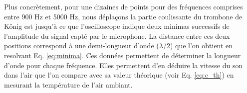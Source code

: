 Plus concrètement, pour une dizaines de points pour des fréquences comprises entre 900 Hz et 5000 Hz, nous déplaçons la partie coulissante du trombone de König est jusqu’à ce que l’oscilloscope indique deux minimas successifs de l’amplitude du signal capté par le microphone. La distance entre ces deux positions correspond à une demi-longueur d’onde ($\lambda$/2) que l'on obtient en resolvant Eq. \ref{eq:minima}. Ces données permettent de déterminer la longueur d’onde pour chaque fréquence. Elles permettent d'en déduire la vitesse du son dans l'air que l'on compare avec sa valeur théorique (voir Eq. \ref{eq:c_th}) en mesurant la température de l'air ambiant.
